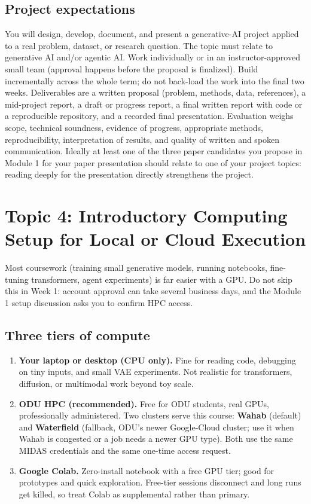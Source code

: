 \documentclass[11pt]{article}
\theoremstyle{remark}
\begin{document}
\subsection{Project expectations}

You will design, develop, document, and present a generative-AI project applied to a real problem, dataset, or research question. The topic must relate to generative AI and/or agentic AI. Work individually or in an instructor-approved small team (approval happens before the proposal is finalized). Build incrementally across the whole term; do not back-load the work into the final two weeks. Deliverables are a written proposal (problem, methods, data, references), a mid-project report, a draft or progress report, a final written report with code or a reproducible repository, and a recorded final presentation. Evaluation weighs scope, technical soundness, evidence of progress, appropriate methods, reproducibility, interpretation of results, and quality of written and spoken communication. Ideally at least one of the three paper candidates you propose in Module 1 for your paper presentation should relate to one of your project topics: reading deeply for the presentation directly strengthens the project.

\section{Topic 4: Introductory Computing Setup for Local or Cloud Execution}

Most coursework (training small generative models, running notebooks, fine-tuning transformers, agent experiments) is far easier with a GPU. Do not skip this in Week 1: account approval can take several business days, and the Module 1 setup discussion asks you to confirm HPC access.

\subsection{Three tiers of compute}

\begin{enumerate}[leftmargin=1.5em,itemsep=2pt]
  \item \textbf{Your laptop or desktop (CPU only).} Fine for reading code, debugging on tiny inputs, and small VAE experiments. Not realistic for transformers, diffusion, or multimodal work beyond toy scale.
  \item \textbf{ODU HPC (recommended).} Free for ODU students, real GPUs, professionally administered. Two clusters serve this course: \textbf{Wahab} (default) and \textbf{Waterfield} (fallback, ODU's newer Google-Cloud cluster; use it when Wahab is congested or a job needs a newer GPU type). Both use the same MIDAS credentials and the same one-time access request.
  \item \textbf{Google Colab.} Zero-install notebook with a free GPU tier; good for prototypes and quick exploration. Free-tier sessions disconnect and long runs get killed, so treat Colab as supplemental rather than primary.
\end{enumerate}
\end{document}
